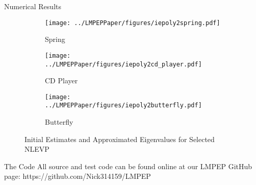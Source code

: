 \documentclass[final,hyperref={pdfpagelabels=false}]{beamer}
\begin{document}
	\begin{block}{Numerical Results}
\begin{figure}
	\centering
	\begin{subfigure}{.3\textwidth}
		\centering
		\texttt{[image: ../LMPEPPaper/figures/iepoly2spring.pdf]}
		\caption{Spring}
		\label{fig:sub1}
	\end{subfigure}%
	\begin{subfigure}{.3\textwidth}
		\centering
		\texttt{[image: ../LMPEPPaper/figures/iepoly2cd\_player.pdf]}
		\caption{CD Player}
		\label{fig:sub2}
	\end{subfigure}
	\begin{subfigure}{.3\textwidth}
	\centering
		\texttt{[image: ../LMPEPPaper/figures/iepoly2butterfly.pdf]}
	\caption{Butterfly}
	\label{fig:sub2}
\end{subfigure}
	\caption{Initial Estimates and Approximated Eigenvalues for Selected NLEVP~\cite{Betcke2013 Problems}}
	\label{fig:test}
\end{figure}
	\end{block}
	\begin{block}{The Code}
	All source and test code can be found online at our LMPEP GitHub page: https://github.com/Nick314159/LMPEP
    \end{block}
\end{document}
